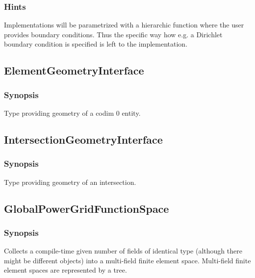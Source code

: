 \documentclass[11pt,a4paper,DIV11,%
notitlepage,oneside,abstracton,%
bibtotoc]{scrartcl}
\begin{document}
\subsubsection{Hints}

Implementations will be parametrized with a hierarchic function where
the user provides boundary conditions. Thus the specific way how
e.g. a Dirichlet boundary condition is specified is left to the
implementation. 


\subsection{ElementGeometryInterface}

\subsubsection{Synopsis}

Type providing geometry of a codim 0 entity.



\subsection{IntersectionGeometryInterface}

\subsubsection{Synopsis}

Type providing geometry of an intersection. 


\subsection{GlobalPowerGridFunctionSpace}

\subsubsection{Synopsis}

Collects a compile-time given number of fields of identical type (although there might
be different objects) into a multi-field finite element space. 
Multi-field finite element spaces are represented by a tree.
\end{document}
